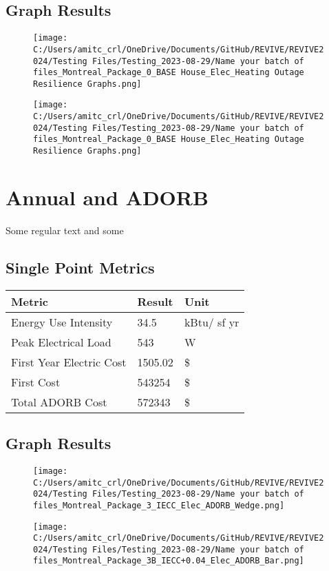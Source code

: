 \documentclass{article}%
\begin{document}
%
\subsection{Graph Results}%
\label{subsec:GraphResults}%


\begin{figure}[h!]%
\centering%
\texttt{[image: C:/Users/amitc\_crl/OneDrive/Documents/GitHub/REVIVE/REVIVE2024/Testing Files/Testing\_2023-08-29/Name your batch of files\_Montreal\_Package\_0\_BASE House\_Elec\_Heating Outage Resilience Graphs.png]}%
\end{figure}

%


\begin{figure}[h!]%
\centering%
\texttt{[image: C:/Users/amitc\_crl/OneDrive/Documents/GitHub/REVIVE/REVIVE2024/Testing Files/Testing\_2023-08-29/Name your batch of files\_Montreal\_Package\_0\_BASE House\_Elec\_Heating Outage Resilience Graphs.png]}%
\end{figure}

%
\section{Annual and ADORB}%
\label{sec:AnnualandADORB}%
Some regular text and some

%
\subsection{Single Point Metrics}%
\label{subsec:SinglePointMetrics}%
\begin{tabular}{l|l|l}%
\hline%
Metric&Result&Unit\\%
\hline%
Energy Use Intensity&34.5&kBtu/ sf yr\\%
Peak Electrical Load&543&W\\%
\hline%
First Year Electric Cost&1505.02&\$\\%
First Cost&543254&\$\\%
Total ADORB Cost&572343&\$\\%
\hline%
\end{tabular}

%
\subsection{Graph Results}%
\label{subsec:GraphResults}%


\begin{figure}[h!]%
\centering%
\texttt{[image: C:/Users/amitc\_crl/OneDrive/Documents/GitHub/REVIVE/REVIVE2024/Testing Files/Testing\_2023-08-29/Name your batch of files\_Montreal\_Package\_3\_IECC\_Elec\_ADORB\_Wedge.png]}%
\end{figure}

%


\begin{figure}[h!]%
\centering%
\texttt{[image: C:/Users/amitc\_crl/OneDrive/Documents/GitHub/REVIVE/REVIVE2024/Testing Files/Testing\_2023-08-29/Name your batch of files\_Montreal\_Package\_3B\_IECC+0.04\_Elec\_ADORB\_Bar.png]}%
\end{figure}

%
\end{document}

